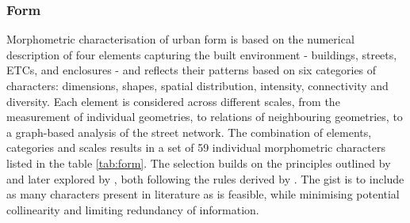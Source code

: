 \documentclass[fleqn,10pt]{wlscirep}
\begin{document}
\subsubsection*{Form}
Morphometric characterisation of urban form is based on the numerical description
of four elements capturing the built environment - buildings, streets, ETCs, and
enclosures - and reflects their patterns based on six categories of
characters: dimensions, shapes, spatial
distribution, intensity, connectivity and diversity\cite{fleischmann2020a}. Each element is considered across
different scales, from the measurement of individual geometries, to relations of
neighbouring geometries, to a graph-based analysis of the street network. The combination of
elements, categories and scales results in a set of 59 individual morphometric
characters listed in the table \ref{tab:form}. The selection builds on the principles
outlined by \cite{dibble2019origin} and later explored by \cite{fleischmann2021}, both
following the rules derived by \cite{sneath1973numerical}. The gist is to include as
many characters present in literature as is feasible, while minimising potential
collinearity and limiting redundancy of information.

\end{document}
